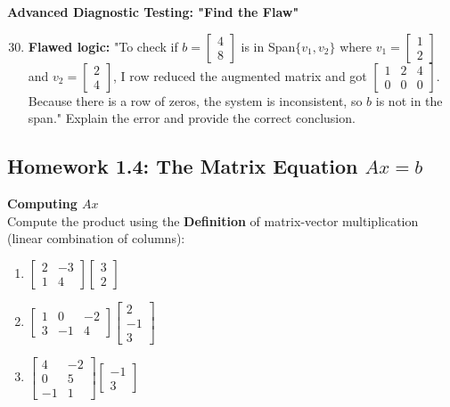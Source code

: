 \documentclass[12pt]{article}
\begin{document}
\textbf{Advanced Diagnostic Testing: "Find the Flaw"}
\begin{enumerate}
\setcounter{enumi}{29}
    \item \textbf{Flawed logic:} "To check if $b = \begin{bmatrix} 4 \\ 8 \end{bmatrix}$ is in Span$\{v_1, v_2\}$ where $v_1 = \begin{bmatrix} 1 \\ 2 \end{bmatrix}$ and $v_2 = \begin{bmatrix} 2 \\ 4 \end{bmatrix}$, I row reduced the augmented matrix and got $\begin{bmatrix} 1 & 2 & 4 \\ 0 & 0 & 0 \end{bmatrix}$. Because there is a row of zeros, the system is inconsistent, so $b$ is not in the span." Explain the error and provide the correct conclusion.
\end{enumerate}


\newpage
\subsection{Homework 1.4: The Matrix Equation $Ax=b$}

\textbf{Computing $Ax$} \\
Compute the product using the \textbf{Definition} of matrix-vector multiplication (linear combination of columns):
\begin{enumerate}
    \item $\begin{bmatrix} 2 & -3 \\ 1 & 4 \end{bmatrix} \begin{bmatrix} 3 \\ 2 \end{bmatrix}$
    \item $\begin{bmatrix} 1 & 0 & -2 \\ 3 & -1 & 4 \end{bmatrix} \begin{bmatrix} 2 \\ -1 \\ 3 \end{bmatrix}$
    \item $\begin{bmatrix} 4 & -2 \\ 0 & 5 \\ -1 & 1 \end{bmatrix} \begin{bmatrix} -1 \\ 3 \end{bmatrix}$
\end{enumerate}
\end{document}
